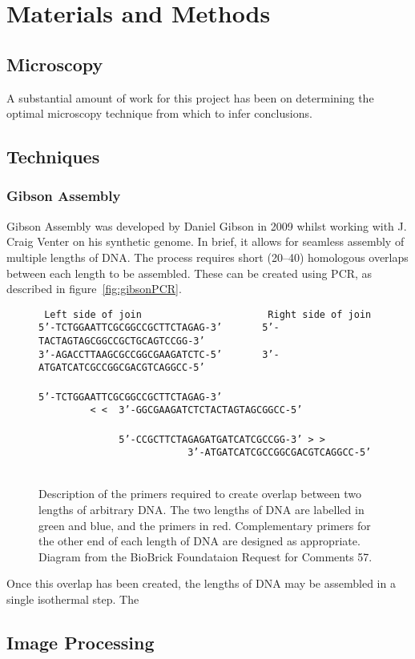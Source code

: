 \documentclass[../main.tex]{subfiles}
\begin{document}
\section{Materials and Methods}

\subsection{Microscopy}

A substantial amount of work for this project has been on determining the optimal microscopy technique from which to infer conclusions.

\subsection{Techniques}

\subsubsection{Gibson Assembly}

Gibson Assembly was developed by Daniel Gibson\cite{gibson09} in 2009 whilst working with J. Craig Venter on his synthetic genome\cite{venter10}. In brief, it allows for seamless assembly of multiple lengths of DNA. The process requires short (\SIrange{20}{40}{\base}) homologous overlaps between each length to be assembled. These can be created using PCR, as described in figure~\ref{fig:gibsonPCR}.
\begin{figure}
\texttt{
Left side of join\ \ \ \ \ \ \ \ \ \ \ \ \ \ \ \ \ \ \ \ \ \ Right side of join\\
\color{DarkGreen}5'-TCTGGAATTCGCGGCCGCTTCTAGAG-3'\color{black}\ \ \ \ \ \ \ \color{DarkBlue}5'-TACTAGTAGCGGCCGCTGCAGTCCGG-3'\\
\color{DarkGreen}3'-AGACCTTAAGCGCCGGCGAAGATCTC-5'\color{black}\ \ \ \ \ \ \ \color{DarkBlue}3'-ATGATCATCGCCGGCGACGTCAGGCC-5'\\
\\
\color{DarkGreen}5'-TCTGGAATTCGCGGCCGCTTCTAGAG-3'\color{black}\\
\color{DarkRed}\ \ \ \ \ \ \ \ \ < < \ 3'-GGCGAAGATCTCTACTAGTAGCGGCC-5'\color{black}
\\\\
\color{DarkRed}\ \ \ \ \ \ \ \ \ \ \  \ \  \ 5'-CCGCTTCTAGAGATGATCATCGCCGG-3' > >\color{black}
\\
\color{DarkBlue}~~~~~~~~~~~~~~~~~~~~~~~~~~3'-ATGATCATCGCCGGCGACGTCAGGCC-5'\\\\
}
\caption{Description of the primers required to create overlap between two lengths of arbitrary DNA. The two lengths of DNA are labelled in green and blue, and the primers in red. Complementary primers for the other end of each length of DNA are designed as appropriate. Diagram from the BioBrick Foundataion Request for Comments 57\cite{rfc57}.}
\end{figure}

Once this overlap has been created, the lengths of DNA may be assembled in a single isothermal step. The 


\subsection{Image Processing}
\end{document}
